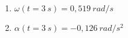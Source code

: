 

\begin{enumerate}[label=\alph*)]
\item 
$\omega(t=3\ s)=0,519\ rad/s$

\item 
$\alpha(t=3\ s)=-0,126\ rad/s^2$
\end{enumerate}

